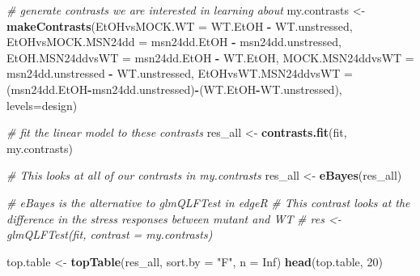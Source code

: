\documentclass[
]{book}
\newenvironment{Shaded}{\begin{snugshade}}{\end{snugshade}}
\newcommand{\AttributeTok}[1]{\textcolor[rgb]{0.13,0.29,0.53}{#1}}
\newcommand{\CommentTok}[1]{\textcolor[rgb]{0.56,0.35,0.01}{\textit{#1}}}
\newcommand{\ConstantTok}[1]{\textcolor[rgb]{0.56,0.35,0.01}{#1}}
\newcommand{\DecValTok}[1]{\textcolor[rgb]{0.00,0.00,0.81}{#1}}
\newcommand{\FunctionTok}[1]{\textcolor[rgb]{0.13,0.29,0.53}{\textbf{#1}}}
\newcommand{\NormalTok}[1]{#1}
\newcommand{\OtherTok}[1]{\textcolor[rgb]{0.56,0.35,0.01}{#1}}
\newcommand{\SpecialCharTok}[1]{\textcolor[rgb]{0.81,0.36,0.00}{\textbf{#1}}}
\newcommand{\StringTok}[1]{\textcolor[rgb]{0.31,0.60,0.02}{#1}}
\begin{document}
\begin{Shaded}
\begin{Highlighting}[]
\CommentTok{\# generate contrasts we are interested in learning about}
\NormalTok{my.contrasts }\OtherTok{\textless{}{-}} \FunctionTok{makeContrasts}\NormalTok{(}\AttributeTok{EtOHvsMOCK.WT =}\NormalTok{ WT.EtOH }\SpecialCharTok{{-}}\NormalTok{ WT.unstressed, }
                     \AttributeTok{EtOHvsMOCK.MSN24dd =}\NormalTok{ msn24dd.EtOH }\SpecialCharTok{{-}}\NormalTok{ msn24dd.unstressed,}
                     \AttributeTok{EtOH.MSN24ddvsWT =}\NormalTok{ msn24dd.EtOH }\SpecialCharTok{{-}}\NormalTok{ WT.EtOH,}
                     \AttributeTok{MOCK.MSN24ddvsWT =}\NormalTok{ msn24dd.unstressed }\SpecialCharTok{{-}}\NormalTok{ WT.unstressed,}
                     \AttributeTok{EtOHvsWT.MSN24ddvsWT =}\NormalTok{ (msn24dd.EtOH}\SpecialCharTok{{-}}\NormalTok{msn24dd.unstressed)}\SpecialCharTok{{-}}\NormalTok{(WT.EtOH}\SpecialCharTok{{-}}\NormalTok{WT.unstressed),}
                     \AttributeTok{levels=}\NormalTok{design)}

\CommentTok{\# fit the linear model to these contrasts}
\NormalTok{res\_all }\OtherTok{\textless{}{-}} \FunctionTok{contrasts.fit}\NormalTok{(fit, my.contrasts)}

\CommentTok{\# This looks at all of our contrasts in my.contrasts}
\NormalTok{res\_all }\OtherTok{\textless{}{-}} \FunctionTok{eBayes}\NormalTok{(res\_all)}

\CommentTok{\# eBayes is the alternative to glmQLFTest in edgeR}
\CommentTok{\# This contrast looks at the difference in the stress responses between mutant and WT}
\CommentTok{\# res \textless{}{-} glmQLFTest(fit, contrast = my.contrasts)}
\end{Highlighting}
\end{Shaded}

\begin{Shaded}
\begin{Highlighting}[]
\NormalTok{top.table }\OtherTok{\textless{}{-}} \FunctionTok{topTable}\NormalTok{(res\_all, }\AttributeTok{sort.by =} \StringTok{"F"}\NormalTok{, }\AttributeTok{n =} \ConstantTok{Inf}\NormalTok{)}
\FunctionTok{head}\NormalTok{(top.table, }\DecValTok{20}\NormalTok{)}
\end{Highlighting}
\end{Shaded}
\end{document}
